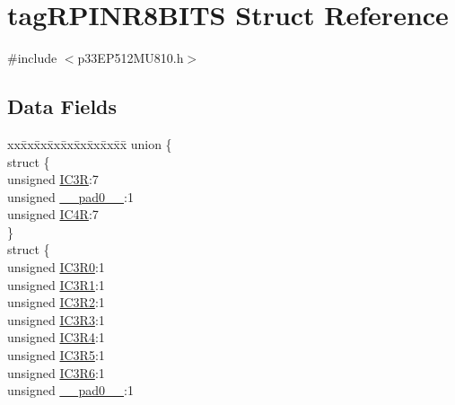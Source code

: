 \hypertarget{structtag_r_p_i_n_r8_b_i_t_s}{}\section{tag\+R\+P\+I\+N\+R8\+B\+I\+TS Struct Reference}
\label{structtag_r_p_i_n_r8_b_i_t_s}


{\ttfamily \#include $<$p33\+E\+P512\+M\+U810.\+h$>$}

\subsection*{Data Fields}
\begin{DoxyCompactItemize}
\item 
\begin{tabbing}
xx\=xx\=xx\=xx\=xx\=xx\=xx\=xx\=xx\=\kill
union \{\\
\>struct \{\\
\>\>unsigned \hyperlink{structtag_r_p_i_n_r8_b_i_t_s_ab93f1e422e48b3402d8183f1f94f8273}{IC3R}:7\\
\>\>unsigned \hyperlink{structtag_r_p_i_n_r8_b_i_t_s_adf71f3d8410c1f1dbbc96680a92c49af}{\_\_pad0\_\_}:1\\
\>\>unsigned \hyperlink{structtag_r_p_i_n_r8_b_i_t_s_a990a00ad50c7a3652b710a4895271c97}{IC4R}:7\\
\>\} \\
\>struct \{\\
\>\>unsigned \hyperlink{structtag_r_p_i_n_r8_b_i_t_s_a7fd1a51c1a3b839e27afa59041dd8da3}{IC3R0}:1\\
\>\>unsigned \hyperlink{structtag_r_p_i_n_r8_b_i_t_s_ad5db2b23d3ea36dff958ea55d53ce365}{IC3R1}:1\\
\>\>unsigned \hyperlink{structtag_r_p_i_n_r8_b_i_t_s_a94b27630ec8cf3a08b9e68998c1afdfb}{IC3R2}:1\\
\>\>unsigned \hyperlink{structtag_r_p_i_n_r8_b_i_t_s_ab721b4e924bec35491115fade863d9e6}{IC3R3}:1\\
\>\>unsigned \hyperlink{structtag_r_p_i_n_r8_b_i_t_s_adb987133b83a16833ca25b471f1e1702}{IC3R4}:1\\
\>\>unsigned \hyperlink{structtag_r_p_i_n_r8_b_i_t_s_aab48370f76a29cbb51e9b67036ef88b9}{IC3R5}:1\\
\>\>unsigned \hyperlink{structtag_r_p_i_n_r8_b_i_t_s_a8f97055dd4ce997e6687c8bf60389ddd}{IC3R6}:1\\
\>\>unsigned \hyperlink{structtag_r_p_i_n_r8_b_i_t_s_adf71f3d8410c1f1dbbc96680a92c49af}{\_\_pad0\_\_}:1\\

\end{tabbing}
\end{DoxyCompactItemize}
